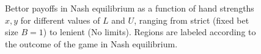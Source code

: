 \documentclass[a4paper,12pt]{article}
\theoremstyle{plain}
\theoremstyle{definition}
\begin{document}
\begin{figure}[h!]
\begin{adjustwidth}{-1in}{-1in}
\begin{minipage}{0.55\textwidth}
        \end{minipage}
    \end{adjustwidth}
    \caption{Bettor payoffs in Nash equilibrium as a function of hand strengths $x, y$ for different values of $L$ and $U$, ranging from strict (fixed bet size $B=1$) to lenient (No limits). Regions are labeled according to the outcome of the game in Nash equilibrium.}
    \label{fig:payoffs}
\end{figure}







\end{document}

